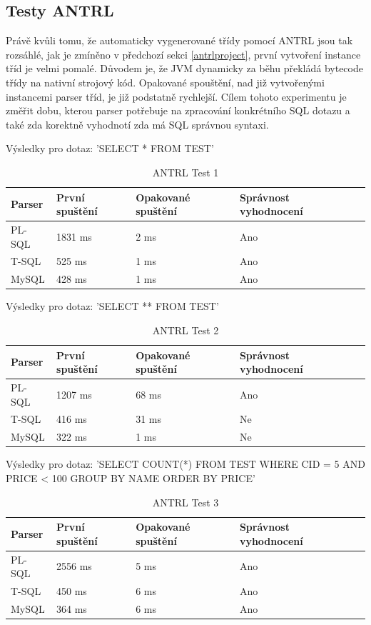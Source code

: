 \documentclass[czech,bachelor,public,dept460,male,cpdeclaration,twoside]{diploma}
\begin{document}
\subsection{Testy ANTRL} \label{antrltest}
Právě kvůli tomu, že automaticky vygenerované třídy pomocí ANTRL jsou tak rozsáhlé, jak je zmíněno v předchozí sekci \ref{antrlproject}, první vytvoření instance tříd je velmi pomalé. Důvodem je, že JVM dynamicky za běhu překládá bytecode třídy na nativní strojový kód. Opakované spouštění, nad již vytvořenými instancemi parser tříd, je již podstatně rychlejší. Cílem tohoto experimentu je změřit dobu, kterou parser potřebuje na zpracování konkrétního SQL dotazu a také zda korektně vyhodnotí zda má SQL správnou syntaxi.

\begin{table}[!htbp]
	\centering
	\caption{ANTRL Test 1}
	Výsledky pro dotaz: 'SELECT * FROM TEST'
	\vskip 0.1cm
	\label{tab:antrl1}
	\begin{tabular}{lllll}
		\toprule
		Parser & První spuštění & Opakované spuštění & Správnost vyhodnocení\\
		\midrule
		PL-SQL & 1831 ms & 2 ms & Ano \\
        T-SQL & 525 ms & 1 ms & Ano \\
        MySQL & 428 ms & 1 ms & Ano \\
		\midrule
	\end{tabular}
\end{table}

\begin{table}[!htbp]
	\centering
	\caption{ANTRL Test 2}
	Výsledky pro dotaz: 'SELECT ** FROM TEST'
	\vskip 0.1cm
	\label{tab:antrl2}
	\begin{tabular}{lllll}
		\toprule
		Parser & První spuštění & Opakované spuštění & Správnost vyhodnocení\\
		\midrule
		PL-SQL & 1207 ms & 68 ms & Ano \\
        T-SQL & 416 ms &31 ms & Ne \\
        MySQL & 322 ms & 1 ms & Ne \\
		\midrule
	\end{tabular}
\end{table}

\begin{table}[!htbp]
	\centering
	\caption{ANTRL Test 3}
	Výsledky pro dotaz: 'SELECT COUNT(*) FROM TEST WHERE CID = 5 AND PRICE < 100 GROUP BY NAME ORDER BY PRICE'
	\vskip 0.1cm
	\label{tab:antrl3}
	\begin{tabular}{lllll}
		\toprule
		Parser & První spuštění & Opakované spuštění & Správnost vyhodnocení\\
		\midrule
		PL-SQL & 2556 ms & 5 ms & Ano \\
        T-SQL & 450 ms & 6 ms & Ano \\
        MySQL & 364 ms & 6 ms & Ano \\
		\midrule
	\end{tabular}
\end{table}
\end{document}
